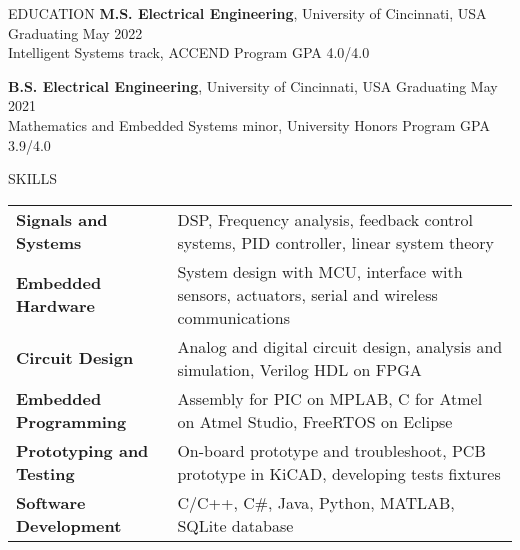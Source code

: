 \documentclass{../lib/resume} %
\begin{document}
	


	
	\begin{rSection}{EDUCATION}
		{\bf M.S. Electrical Engineering}, University of Cincinnati, USA \hfill {Graduating May 2022} \\
		Intelligent Systems track, ACCEND Program \hfill GPA 4.0/4.0 \smallskip
		
		{\bf B.S. Electrical Engineering}, University of Cincinnati, USA \hfill {Graduating May 2021}\\
		Mathematics and Embedded Systems minor, University Honors Program \hfill {GPA 3.9/4.0}
		
		
		
		
	\end{rSection}
	
	\begin{rSection}{SKILLS}
		
		\begin{tabular}{ @{} >{\bfseries}l @{\hspace{2ex}} l }
			Signals and Systems & DSP, Frequency analysis, feedback control systems, PID controller, linear system theory	\\
			Embedded Hardware & System design with MCU, interface with sensors, actuators, serial and wireless communications \\ 
			Circuit Design & Analog and digital circuit design, analysis and simulation, Verilog HDL on FPGA \\
			Embedded Programming & Assembly for PIC on MPLAB, C for Atmel on Atmel Studio, FreeRTOS on Eclipse \\
			Prototyping and Testing &  On-board prototype and troubleshoot, PCB prototype in KiCAD, developing tests fixtures \\ 
			Software Development & C/C++, C\#, Java, Python, MATLAB, SQLite database \\
		\end{tabular}
	\end{rSection}
	
\end{document}
